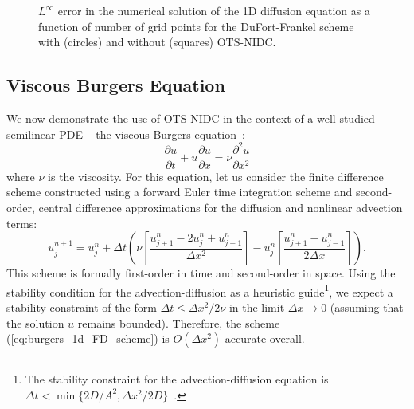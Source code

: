 \documentclass[fleqn,12pt,twoside]{article}
\newcommand{\beq}{\begin{equation}}
\newcommand{\eeq}{\end{equation}}
\def\pt{\partial t}
\def\px{\partial x}
\def\dt{\Delta t}
\def\dx{\Delta x}
\begin{document}
\begin{figure}[tb]
\begin{center}
\caption{$L^\infty$ error in the numerical solution of the 1D diffusion 
equation as a function of number of grid points for the DuFort-Frankel scheme 
with (circles) and without (squares) OTS-NIDC.
}
\label{fig:diffusion_eqn_1d_dufort_frankel_error} 
\end{center}
\end{figure}



\subsection{Viscous Burgers Equation}
We now demonstrate the use of OTS-NIDC in the context of a well-studied
semilinear PDE -- the viscous Burgers equation~\cite{whitham_book}:
\beq
  \frac{\partial u}{\pt} + u \frac{\partial u}{\px} = 
     \nu \frac{\partial^2 u}{\px^2} 
  \label{eq:burgers_1d}
\eeq
where $\nu$ is the viscosity.  For this equation, let us consider the finite
difference scheme constructed using a forward Euler time integration scheme
and second-order, central difference approximations for the diffusion and 
nonlinear advection terms:
\beq
  u^{n+1}_j = u^{n}_j 
  + \dt 
    \left( \nu 
      \left [ \frac{u^{n}_{j+1} -2 u^{n}_j + u^{n}_{j-1}}{\dx^2} \right]
         - u^n_j 
      \left[ \frac{u^{n}_{j+1} - u^{n}_{j-1}}{2 \dx} \right] 
    \right).
  \label{eq:burgers_1d_FD_scheme}
\eeq
This scheme is formally first-order in time and second-order in space.  
Using the stability condition for the advection-diffusion as a heuristic 
guide\footnote{The stability constraint for the advection-diffusion equation
is $\dt < \min \{2D/A^2, \dx^2/2D \}$~\cite{chan_1984}.}, 
we expect a stability constraint of the form $\dt \le \dx^2/2 \nu$ in the 
limit $\dx \rightarrow 0$ (assuming that the solution $u$ remains bounded).  
Therefore, the scheme (\ref{eq:burgers_1d_FD_scheme}) is $O(\dx^2)$ accurate 
overall. 
\end{document}
